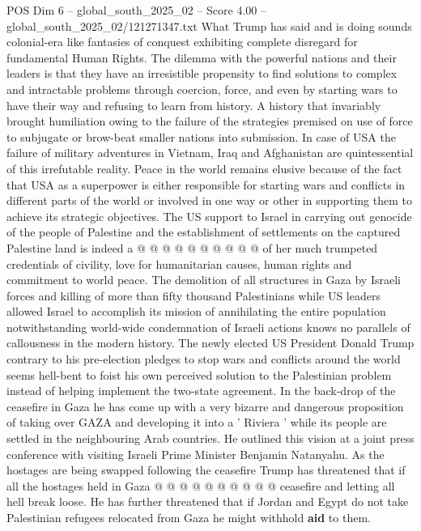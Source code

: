 \begin{textsample}{POS Dim 6 – global\_south\_2025\_02 – Score 4.00 – global\_south\_2025\_02/121271347.txt}  \label{ex:f6_pos_401}
What Trump has said and is doing sounds colonial-era like fantasies of conquest exhibiting complete disregard for fundamental Human Rights.
The dilemma with the powerful nations and their leaders is that they have an irresistible propensity to find solutions to complex and intractable problems through coercion, force, and even by starting wars to have their way and refusing to learn from history.
A history that invariably brought humiliation owing to the failure of the strategies premised on use of force to subjugate or brow-beat smaller nations into submission.
In case of USA the failure of military adventures in Vietnam, Iraq and Afghanistan are quintessential of this irrefutable reality.
Peace in the world remains elusive because of the fact that USA as a superpower is either responsible for starting wars and conflicts in different parts of the world or involved in one way or other in supporting them to achieve its strategic objectives.
The US support to Israel in carrying out genocide of the people of Palestine and the establishment of settlements on the captured Palestine land is indeed a @ @ @ @ @ @ @ @ @ @ of her much trumpeted credentials of civility, love for humanitarian causes, human rights and commitment to world peace.
The demolition of all structures in Gaza by Israeli forces and killing of more than fifty thousand Palestinians while US leaders allowed Israel to accomplish its mission of annihilating the entire population notwithstanding world-wide condemnation of Israeli actions knows no parallels of callousness in the modern history.
The newly elected US President Donald Trump contrary to his pre-election pledges to stop wars and conflicts around the world seems hell-bent to foist his own perceived solution to the Palestinian problem instead of helping implement the two-state agreement.
In the back-drop of the ceasefire in Gaza he has come up with a very bizarre and dangerous proposition of taking over GAZA and developing it into a ' Riviera ' while its people are settled in the neighbouring Arab countries.
He outlined this vision at a joint press conference with visiting Israeli Prime Minister Benjamin Natanyahu.
As the hostages are being swapped following the ceasefire Trump has threatened that if all the hostages held in Gaza @ @ @ @ @ @ @ @ @ @ ceasefire and letting all hell break loose.
He has further threatened that if Jordan and Egypt do not take Palestinian refugees relocated from Gaza he might withhold \textbf{aid} to them.

\end{textsample}
